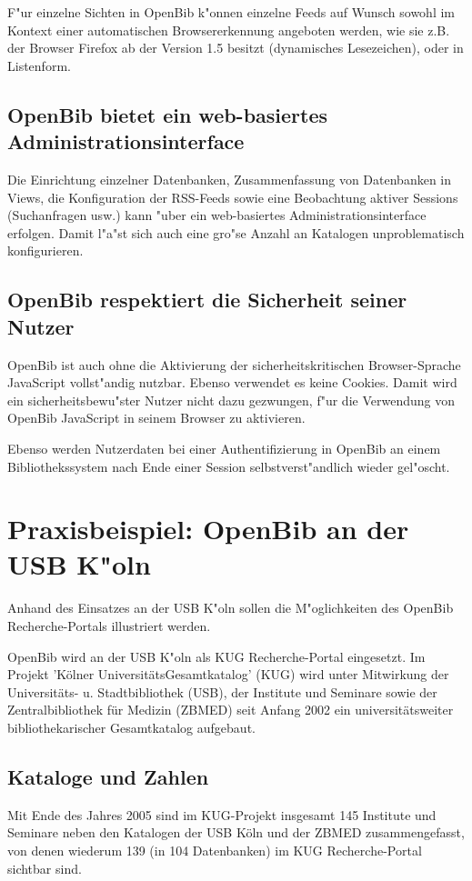 \documentclass[11pt, twoside, a4paper, BCOR8mm, DIV12, bibtotoc,idxtotoc]{scrbook}
\begin{document}
F"ur einzelne Sichten in OpenBib k"onnen einzelne Feeds auf Wunsch
sowohl im Kontext einer automatischen Browsererkennung angeboten
werden, wie sie z.B. der Browser Firefox ab der Version 1.5 besitzt
(dynamisches Lesezeichen), oder in Listenform.

\section{OpenBib bietet ein web-basiertes Administrationsinterface}
Die Einrichtung einzelner Datenbanken, Zusammenfassung von Datenbanken
in Views, die Kon\-fi\-gu\-ra\-tion der RSS-Feeds sowie eine Beobachtung
aktiver Sessions (Suchanfragen usw.) kann "uber ein web-basiertes
Administrationsinterface erfolgen. Damit l"a"st sich auch eine gro"se
Anzahl an Katalogen unproblematisch konfigurieren.

\section{OpenBib respektiert die Sicherheit seiner Nutzer}

OpenBib ist auch ohne die Aktivierung der sicherheitskritischen
Browser-Sprache JavaScript vollst"andig nutzbar. Ebenso verwendet es
keine Cookies. Damit wird ein sicherheitsbewu"ster Nutzer nicht dazu
gezwungen, f"ur die Verwendung von OpenBib JavaScript in seinem
Browser zu aktivieren.

Ebenso werden Nutzerdaten bei einer Authentifizierung in OpenBib an
einem Bibliothekssystem nach Ende einer Session selbstverst"andlich
wieder gel"oscht.

\chapter{Praxisbeispiel: OpenBib an der USB K"oln}
Anhand des Einsatzes an der USB K"oln sollen die M"oglichkeiten des
OpenBib Recherche-Portals illustriert werden.

OpenBib wird an der USB K"oln als KUG Recherche-Portal eingesetzt. Im
Projekt 'Kölner UniversitätsGesamtkatalog' (KUG) wird unter Mitwirkung
der Universitäts- u. Stadtbibliothek (USB), der Institute und Seminare
sowie der Zentralbibliothek für Medizin (ZBMED) seit Anfang 2002 ein
universitätsweiter bibliothekarischer Gesamtkatalog aufgebaut.

\section{Kataloge und Zahlen}
Mit Ende des Jahres 2005 sind im KUG-Projekt insgesamt 145 Institute
und Seminare neben den Katalogen der USB Köln und der ZBMED
zusammengefasst, von denen wiederum 139 (in 104 Datenbanken) im KUG
Recherche-Portal sichtbar sind. 
\end{document}
